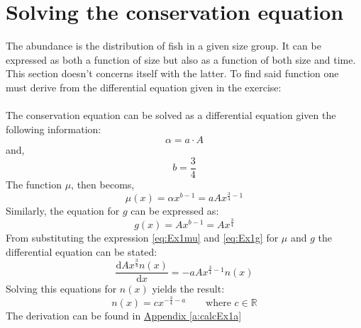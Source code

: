 \documentclass{article}
\numberwithin{equation}{section} %
\newcommand{\md}{\mathrm{d}}
\begin{document}
\section{Solving the conservation equation}\label{sec:Ex1}
The abundance is the distribution of fish in a given size group. It can be expressed as both a function of size but also as a function of both size and time. This section doesn't concerns itself with the latter. To find said function one must derive from the differential equation given in the exercise:\\
\\
The conservation equation can be solved as a differential equation given the following information:
\begin{equation}\label{eq:alphaaa}
	\alpha = a \cdot A
\end{equation}
and,
\begin{equation}
	b = \dfrac{3}{4}
\end{equation}
The function $\mu$, then becoms,
\begin{equation}\label{eq:Ex1mu}
	\mu (x) = \alpha x^{b-1} = aAx^{\tfrac{3}{4}-1}
\end{equation}
Similarly, the equation for $g$ can be expressed as:
\begin{equation}\label{eq:Ex1g}
	g(x) = Ax^{b-1} =Ax^{\tfrac{3}{4}}
\end{equation}
From substituting the expression \ref{eq:Ex1mu} and \ref{eq:Ex1g} for $\mu$ and $g$ the differential equation can be stated:
\begin{equation}
	\dfrac{\md Ax^{\tfrac{3}{4}}n(x)}{\md x} = -aAx^{\tfrac{3}{4}-1}n(x)
\end{equation}
Solving this equations for $n(x)$ yields the result:
\begin{equation}\label{eq:Ex1n}
	n(x) = cx^{-\tfrac{3}{4}-a} \qquad \textrm{where } c \in \mathbb{R}
\end{equation}
The derivation can be found in \hyperref[a:calcEx1a]{Appendix \ref{a:calcEx1a}}\label{jmp:a:calcEx1a}
\end{document}
